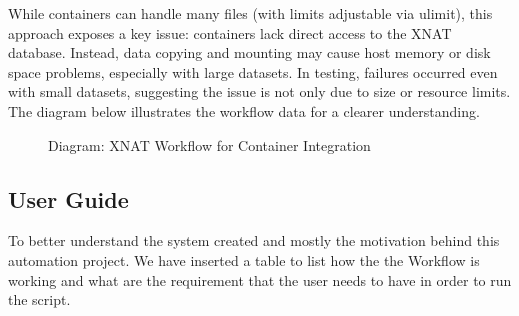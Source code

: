 While containers can handle many files (with limits adjustable via ulimit), this approach exposes a key issue: containers lack direct access to the XNAT database. Instead, data copying and mounting may cause host memory or disk space problems, especially with large datasets. In testing, failures occurred even with small datasets, suggesting the issue is not only due to size or resource limits.
The diagram below illustrates the workflow data for a clearer understanding.  
\begin{figure}[ht]
    \centering
    \def\svgwidth{\linewidth} 
    
    \caption{Diagram: XNAT Workflow for Container Integration}
    \label{fig:workflowxnat}
\end{figure}



\normalsize


\subsection{User Guide}
To better understand the system created and mostly the motivation behind this automation project. We have inserted a table to list how the the Workflow is working and what are the requirement that the user needs to have in order to run the script.

